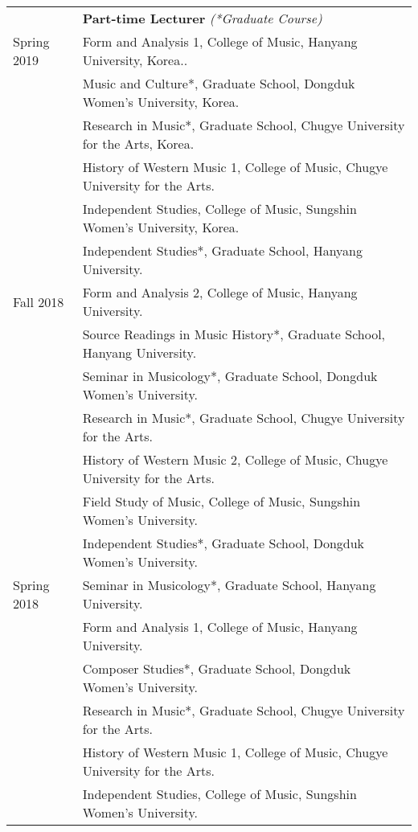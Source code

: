 \documentclass[a4paper,11pt]{article}
\begin{document}
  \hspace*{-0.25cm}
  \begin{tabular}{p{2.5cm} l}
    & \textbf{Part-time Lecturer} \textit{(*Graduate Course)}\\
    Spring 2019 & Form and Analysis 1, College of Music, Hanyang University, Korea..\\
    & Music and Culture*, Graduate School, Dongduk Women's University, Korea.\\
    & Research in Music*, Graduate School, Chugye University for the Arts, Korea.\\
    & History of Western Music 1, College of Music, Chugye University for the Arts.\\
    & Independent Studies, College of Music, Sungshin Women's University, Korea.\\
    & Independent Studies*, Graduate School, Hanyang University.\\
    
    Fall 2018 & Form and Analysis 2, College of Music, Hanyang University.\\
    & Source Readings in Music History*, Graduate School, Hanyang University.\\
    & Seminar in Musicology*, Graduate School, Dongduk Women's University.\\
    & Research in Music*, Graduate School, Chugye University for the Arts.\\
    & History of Western Music 2, College of Music, Chugye University for the Arts.\\
    & Field Study of Music, College of Music, Sungshin Women's University.\\
    & Independent Studies*, Graduate School, Dongduk Women's University.\\
    
    Spring 2018 & Seminar in Musicology*, Graduate School, Hanyang University.\\
    & Form and Analysis 1, College of Music, Hanyang University.\\
    & Composer Studies*, Graduate School, Dongduk Women's University.\\
    & Research in Music*, Graduate School, Chugye University for the Arts.\\
    & History of Western Music 1, College of Music, Chugye University for the Arts.\\
    & Independent Studies, College of Music, Sungshin Women's University.\\
    

\end{tabular}
\end{document}
